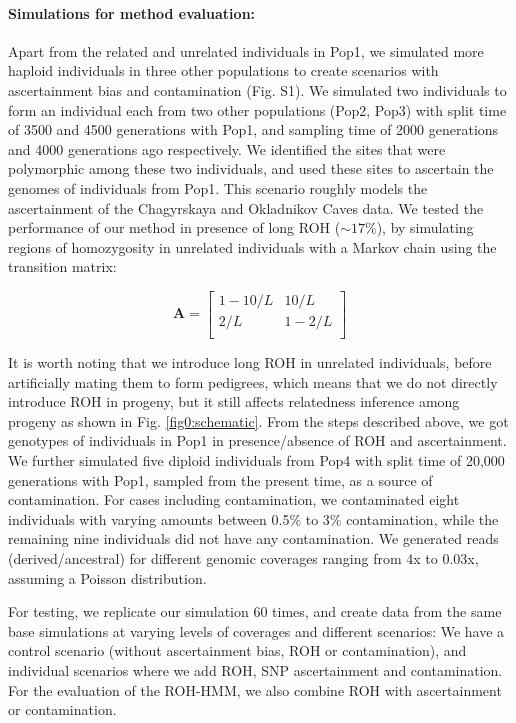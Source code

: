 \documentclass[12pt, letterpaper]{article}
\begin{document}
\paragraph{Simulations for method evaluation:}
Apart from the related and unrelated individuals in Pop1, we simulated more haploid individuals in three other populations to create scenarios with ascertainment bias and contamination (Fig. S1). We simulated two individuals to form an individual each from two other populations (Pop2, Pop3) with split time of 3500 and 4500 generations with Pop1, and sampling time of 2000 generations and 4000 generations ago respectively.  We identified the sites that were polymorphic among these two individuals, and used these sites to ascertain the genomes of individuals from Pop1. This scenario roughly models the ascertainment of the Chagyrskaya and Okladnikov Caves data. We tested the performance of our method in presence of long ROH ($\sim17\%$), by simulating regions of homozygosity in unrelated individuals with a Markov chain using the transition matrix:

$$\mathbf{A} = \left[\begin{array}
{rr}
1-10/L & 10/L \\
2/L & 1-2/L  \\
\end{array}\right]
$$

It is worth noting that we introduce long ROH in unrelated individuals, before artificially mating them to form pedigrees, which means that we do not directly introduce ROH in progeny, but it still affects relatedness inference among progeny as shown in Fig. \ref{fig0:schematic}. 
From the steps described above, we got genotypes of individuals in Pop1 in presence/absence of ROH and ascertainment. We further simulated five diploid individuals from Pop4 with split time of 20,000 generations with Pop1, sampled from the present time, as a source of contamination.  For cases including contamination, we contaminated eight individuals with varying amounts between 0.5\% to 3\% contamination, while the remaining  nine individuals did not have any contamination. We generated reads (derived/ancestral) for different genomic coverages ranging from 4x to 0.03x, assuming a Poisson distribution.

For testing, we replicate our simulation 60 times, and create data from the same base simulations at varying levels of coverages and different scenarios: We have a control scenario (without ascertainment bias, ROH or contamination), and individual scenarios where we add ROH, SNP ascertainment and contamination. For the evaluation of the ROH-HMM, we also combine ROH with ascertainment or contamination.
\end{document}
